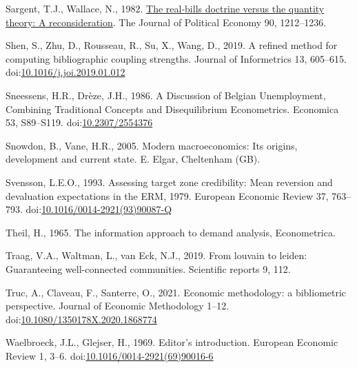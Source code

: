 \documentclass[
  12pt,
  onecolumn]{article}
\newlength{\cslhangindent}
\newlength{\cslentryspacingunit} %
\newenvironment{CSLReferences}[2] %
 {%
  \setlength{\parindent}{0pt}
  \ifodd #1
  \let\oldpar\par
  \def\par{\hangindent=\cslhangindent\oldpar}
  \fi
  \setlength{\parskip}{#2\cslentryspacingunit}
 }%
 {}
\begin{document}
\begin{CSLReferences}{1}{0}
\leavevmode{}%
Sargent, T.J., Wallace, N., 1982.
\href{http://www.jstor.org/stable/1830945}{The real-bills doctrine
versus the quantity theory: {A} reconsideration}. The Journal of
Political Economy 90, 1212--1236.

\leavevmode{}%
Shen, S., Zhu, D., Rousseau, R., Su, X., Wang, D., 2019. A refined
method for computing bibliographic coupling strengths. Journal of
Informetrics 13, 605--615.
doi:\href{https://doi.org/10.1016/j.joi.2019.01.012}{10.1016/j.joi.2019.01.012}

\leavevmode{}%
Sneessens, H.R., Drèze, J.H., 1986. A {Discussion} of {Belgian
Unemployment}, {Combining Traditional Concepts} and {Disequilibrium
Econometrics}. Economica 53, S89--S119.
doi:\href{https://doi.org/10.2307/2554376}{10.2307/2554376}

\leavevmode{}%
Snowdon, B., Vane, H.R., 2005. Modern macroeconomics: Its origins,
development and current state. {E. Elgar}, {Cheltenham (GB)}.

\leavevmode{}%
Svensson, L.E.O., 1993. Assessing target zone credibility: {Mean}
reversion and devaluation expectations in the {ERM},
1979. European Economic Review 37, 763--793.
doi:\href{https://doi.org/10.1016/0014-2921(93)90087-Q}{10.1016/0014-2921(93)90087-Q}

\leavevmode{}%
Theil, H., 1965. The information approach to demand analysis,
Econometrica.

\leavevmode{}%
Traag, V.A., Waltman, L., van Eck, N.J., 2019. From louvain to leiden:
Guaranteeing well-connected communities. Scientific reports 9, 112.

\leavevmode{}%
Truc, A., Claveau, F., Santerre, O., 2021. Economic methodology: a
bibliometric perspective. Journal of Economic Methodology 1--12.
doi:\href{https://doi.org/10.1080/1350178X.2020.1868774}{10.1080/1350178X.2020.1868774}

\leavevmode{}%
Waelbroeck, J.L., Glejser, H., 1969. Editor's introduction. European
Economic Review 1, 3--6.
doi:\href{https://doi.org/10.1016/0014-2921(69)90016-6}{10.1016/0014-2921(69)90016-6}

\end{CSLReferences}
\end{document}
